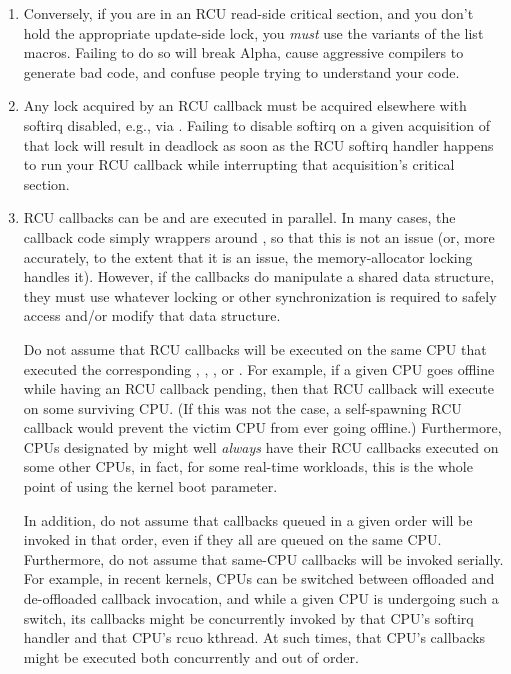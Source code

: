 \begin{enumerate}[start=0]
\item	Conversely, if you are in an RCU read-side critical section,
	and you don't hold the appropriate update-side lock, you \emph{must}
	use the  variants of the list macros.
	Failing to do so
	will break Alpha, cause aggressive compilers to generate bad code,
	and confuse people trying to understand your code.

\item	Any lock acquired by an RCU callback must be acquired elsewhere
	with softirq disabled, e.g., via .
	Failing to
	disable softirq on a given acquisition of that lock will result
	in deadlock as soon as the RCU softirq handler happens to run
	your RCU callback while interrupting that acquisition's critical
	section.

\item	RCU callbacks can be and are executed in parallel.
	In many cases,
	the callback code simply wrappers around , so that this
	is not an issue (or, more accurately, to the extent that it is
	an issue, the memory-allocator locking handles it).
	However,
	if the callbacks do manipulate a shared data structure, they
	must use whatever locking or other synchronization is required
	to safely access and/or modify that data structure.

	Do not assume that RCU callbacks will be executed on the same
	CPU that executed the corresponding , ,
	, or .
	For example, if
	a given CPU goes offline while having an RCU callback pending,
	then that RCU callback will execute on some surviving CPU\@.
	(If this was not the case, a self-spawning RCU callback would
	prevent the victim CPU from ever going offline.)
	Furthermore,
	CPUs designated by  might well \emph{always} have their
	RCU callbacks executed on some other CPUs, in fact, for some
	real-time workloads, this is the whole point of using the
	 kernel boot parameter.

	In addition, do not assume that callbacks queued in a given order
	will be invoked in that order, even if they all are queued on the
	same CPU\@.
	Furthermore, do not assume that same-CPU callbacks will
	be invoked serially.
	For example, in recent kernels, CPUs can be
	switched between offloaded and de-offloaded callback invocation,
	and while a given CPU is undergoing such a switch, its callbacks
	might be concurrently invoked by that CPU's softirq handler and
	that CPU's rcuo kthread.
	At such times, that CPU's callbacks
	might be executed both concurrently and out of order.


\end{enumerate}
